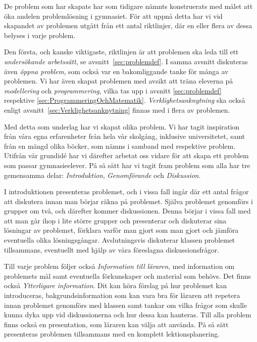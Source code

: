 \textcolor{lila}{De problem som har skapats har som tidigare nämnts konstruerats med målet att öka andelen problemlösning i gymnasiet. För att uppnå detta har vi vid skapandet av problemen utgått från ett antal riktlinjer, där en eller flera av dessa belyses i varje problem.}

\textcolor{lila}{Den första, och kanske viktigaste, riktlinjen är att problemen ska leda till ett \textsl{undersökande arbetssätt}, se avsnitt~\ref{sec:problemdef}. I samma avsnitt diskuteras även \textsl{öppna problem}, som också var en bakomliggande tanke för många av problemen. Vi har även skapat problemen med avsikt att träna eleverna på \textsl{modellering} och \textsl{programmering}, vilka tas upp i avsnitt \ref{sec:problemdef} respektive \ref{sec:ProgrammeringOchMatematik}. \textsl{Verklighetsanknytning} ska också enligt avsnitt~\ref{sec:Verklighetsanknytning} finnas med i flera av problemen.}

\textcolor{lila}{Med detta som underlag har vi skapat olika problem. Vi har tagit inspiration från våra egna erfarenheter från hela vår skolgång, inklusive universitetet, samt från en mängd olika böcker, som nämns i samband med respektive problem. Utifrån vår grundidé har vi därefter arbetat oss vidare för att skapa ett problem som passar gymnasieelever. På så sätt har vi tagit fram problem som alla har tre gemensamma delar: \textsl{Introduktion}, \textsl{Genomförande} och \textsl{Diskussion}.}

\textcolor{lila}{I introduktionen presenteras problemet, och i vissa fall ingår där ett antal frågor att diskutera innan man börjar räkna på problemet. Själva problemet genomförs i grupper om två, och därefter kommer diskussionen. Denna börjar i vissa fall med att man går ihop i lite större grupper och presenterar och diskuterar sina lösningar av problemet, förklara varför man gjort som man gjort och jämföra eventuella olika lösningsgångar. Avslutningsvis diskuterar klassen problemet tillsammans, eventuellt med hjälp av våra föreslagna diskussionsfrågor.} 

\textcolor{lila}{Till varje problem följer också \textsl{Information till läraren}, med information om problemets mål samt eventuella förkunskaper och material som behövs. Det finns också \textsl{Ytterligare information}. Dit kan höra förslag på hur problemet kan introduceras, bakgrundsinformation som kan vara bra för läraren att repetera innan problemet genomförs med klassen samt tankar om vilka frågor som skulle kunna dyka upp vid diskussionerna och hur dessa kan hanteras. Till alla problem finns också en presentation, som läraren kan välja att använda. På så sätt presenteras problemen tillsammans med en komplett lektionsplanering.}


